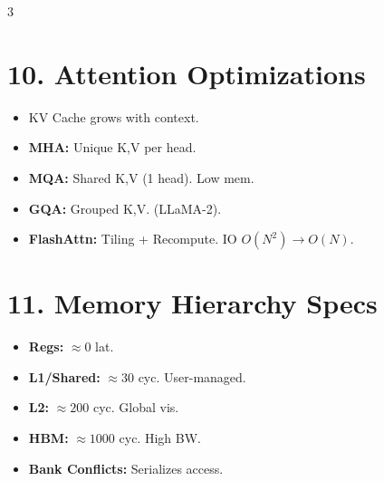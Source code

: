 \documentclass[8pt, a4paper, landscape]{article}
\begin{document}
\begin{multicols*}{3}
\section{10. Attention Optimizations}
\begin{itemize}
    \item KV Cache grows with context.
    \item \textbf{MHA:} Unique K,V per head.
    \item \textbf{MQA:} Shared K,V (1 head). Low mem.
    \item \textbf{GQA:} Grouped K,V. (LLaMA-2).
    \item \textbf{FlashAttn:} Tiling + Recompute. IO $O(N^2) \to O(N)$.
\end{itemize}

\section{11. Memory Hierarchy Specs}
\begin{itemize}
    \item \textbf{Regs:} $\approx 0$ lat.
    \item \textbf{L1/Shared:} $\approx 30$ cyc. User-managed.
    \item \textbf{L2:} $\approx 200$ cyc. Global vis.
    \item \textbf{HBM:} $\approx 1000$ cyc. High BW.
    \item \textbf{Bank Conflicts:} Serializes access.
\end{itemize}

\end{multicols*}
\end{document}
